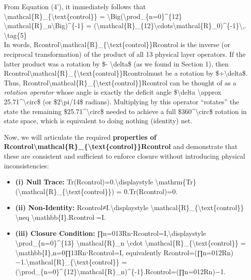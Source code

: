\documentclass[]{article}
\begin{document}
From Equation (4'), it immediately follows that\\
\textbackslash{}mathcal\{R\}\_\{\textbackslash{}text\{control\}\} =
\textbackslash{}Big(\textbackslash{}prod\_\{n=0\}\^{}\{12\}
\textbackslash{}mathcal\{R\}\_n\textbackslash{}Big)\^{}\{-1\} =
(\textbackslash{}mathcal\{R\}\_\{12\}\textbackslash{}cdots\textbackslash{}mathcal\{R\}\_0)\^{}\{-1\}\textbackslash{},.
\textbackslash{}tag\{5\}\\
In words,
Rcontrol\textbackslash{}mathcal\{R\}\_\{\textbackslash{}text\{control\}\}Rcontrol​
is the inverse (or reciprocal transformation) of the product of all 13
physical layer operators. If the latter product was a rotation by \$-
\textbackslash{}delta\$ (as we found in Section 1), then
Rcontrol\textbackslash{}mathcal\{R\}\_\{\textbackslash{}text\{control\}\}Rcontrol​
must be a rotation by \$+\textbackslash{}delta\$. Thus,
Rcontrol\textbackslash{}mathcal\{R\}\_\{\textbackslash{}text\{control\}\}Rcontrol​
can be thought of as a \emph{rotation operator} whose angle is exactly
the deficit angle \$\textbackslash{}delta \textbackslash{}approx
25.71\^{}\textbackslash{}circ\$ (or \$2\textbackslash{}pi/14\$ radians).
Multiplying by this operator ``rotates'' the state the remaining
\$25.71\^{}\textbackslash{}circ\$ needed to achieve a full
\$360\^{}\textbackslash{}circ\$ rotation in state space, which is
equivalent to doing nothing (identity) net.

Now, we will articulate the required \textbf{properties of
Rcontrol\textbackslash{}mathcal\{R\}\_\{\textbackslash{}text\{control\}\}Rcontrol​}
and demonstrate that these are consistent and sufficient to enforce
closure without introducing physical inconsistencies:

\begin{itemize}
\item
  \textbf{(i) Null Trace:} Tr(Rcontrol)=0.\textbackslash{}displaystyle
  \textbackslash{}mathrm\{Tr\}(\textbackslash{}mathcal\{R\}\_\{\textbackslash{}text\{control\}\})
  = 0.Tr(Rcontrol​)=0.
\item
  \textbf{(ii) Non-Identity:} Rcontrol≠I.\textbackslash{}displaystyle
  \textbackslash{}mathcal\{R\}\_\{\textbackslash{}text\{control\}\}
  \textbackslash{}neq \textbackslash{}mathbb\{I\}.Rcontrol​=I.
\item
  \textbf{(iii) Closure Condition:}
  ∏n=013Rn⋅Rcontrol=I,\textbackslash{}displaystyle
  \textbackslash{}prod\_\{n=0\}\^{}\{13\}
  \textbackslash{}mathcal\{R\}\_n \textbackslash{}cdot
  \textbackslash{}mathcal\{R\}\_\{\textbackslash{}text\{control\}\} =
  \textbackslash{}mathbb\{I\},n=0∏13​Rn​⋅Rcontrol​=I, equivalently
  Rcontrol=(∏n=012Rn)−1.\textbackslash{}mathcal\{R\}\_\{\textbackslash{}text\{control\}\}
  =
  (\textbackslash{}prod\_\{n=0\}\^{}\{12\}\textbackslash{}mathcal\{R\}\_n)\^{}\{-1\}.Rcontrol​=(∏n=012​Rn​)−1.
\end{itemize}
\end{document}
